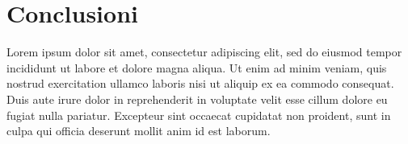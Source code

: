 \documentclass[a4paper,twoside,12pt]{toptesi}
\begin{document}
\chapter{Conclusioni}
Lorem ipsum dolor sit amet, consectetur adipiscing elit, sed do eiusmod tempor incididunt ut labore et dolore magna aliqua. Ut enim ad minim veniam, quis nostrud exercitation ullamco laboris nisi ut aliquip ex ea commodo consequat. Duis aute irure dolor in reprehenderit in voluptate velit esse cillum dolore eu fugiat nulla pariatur. Excepteur sint occaecat cupidatat non proident, sunt in culpa qui officia deserunt mollit anim id est laborum.

  


\end{document}
